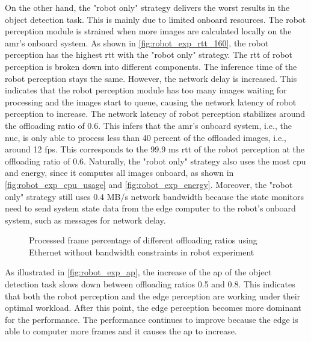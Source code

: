 On the other hand, the "robot only" strategy delivers the worst results in the object detection task. This is mainly due to limited onboard resources. The robot perception module is strained when more images are calculated locally on the \gls{amr}'s onboard system. As shown in \cref{fig:robot_exp_rtt_160}, the robot perception has the highest \gls{rtt} with the "robot only" strategy. The \gls{rtt} of robot perception is broken down into different components. The inference time of the robot perception stays the same. However, the network delay is increased. This indicates that the robot perception module has too many images waiting for processing and the images start to queue, causing the network latency of robot perception to increase. The network latency of robot perception stabilizes around the offloading ratio of 0.6. This infers that the \gls{amr}'s onboard system, i.e., the \gls{nuc}, is only able to process less than 40 percent of the offloaded images, i.e., around 12 \gls{fps}. This corresponds to the 99.9 ms \gls{rtt} of the robot perception at the offloading ratio of 0.6. Naturally, the "robot only" strategy also uses the most \gls{cpu} and energy, since it computes all images onboard, as shown in \cref{fig:robot_exp_cpu_usage} and \cref{fig:robot_exp_energy}. Moreover, the "robot only" strategy still uses 0.4 MB/s network bandwidth because the state monitors need to send system state data from the edge computer to the robot's onboard system, such as messages for network delay.

\begin{figure}
    \centering
    
    \caption{Processed frame percentage of different offloading ratios using Ethernet without bandwidth constraints in robot experiment}
    \label{fig:robot_exp_processed_frame_percentage_320}
\end{figure}

As illustrated in \cref{fig:robot_exp_ap}, the increase of the \gls{ap} of the object detection task slows down between offloading ratios 0.5 and 0.8. This indicates that both the robot perception and the edge perception are working under their optimal workload. After this point, the edge perception becomes more dominant for the performance. The performance continues to improve because the edge is able to computer more frames and it causes the \gls{ap} to increase. 

